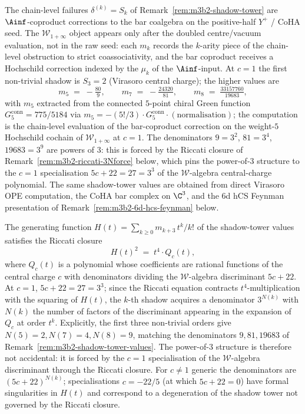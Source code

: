\begin{remark}
\label{rem:m3b2-shadow-tower-values}
The chain-level failures $\delta^{(k)} = S_k$ of
Remark~\ref{rem:m3b2-shadow-tower} are $\Ainf$-coproduct corrections to
the bar coalgebra on the positive-half $Y^+$ / CoHA seed. The
$\mathcal{W}_{1+\infty}$ object appears only after the doubled
centre/vacuum evaluation, not in the raw seed: each
$m_k$ records the $k$-arity piece of the chain-level obstruction to
strict coassociativity, and the bar coproduct receives a Hochschild
correction indexed by the $\mu_k$ of the $\Ainf$-input. At
$c = 1$ the first non-trivial shadow is $S_3 = 2$ (Virasoro central
charge); the higher values are
\[
 m_5 \;=\; -\tfrac{80}{9}, \qquad
 m_7 \;=\; -\tfrac{24320}{81}, \qquad
 m_8 \;=\; \tfrac{33157760}{19683},
\]
with $m_5$ extracted from the connected $5$-point chiral Green function
$G_5^{\mathrm{conn}} = 775/5184$ via $m_5 = -(5!/3) \cdot G_5^{\mathrm{conn}}
\cdot (\text{normalisation})$; the computation is the chain-level evaluation
of the bar-coproduct correction on the weight-$5$ Hochschild
cochain of $\mathcal{W}_{1+\infty}$ at $c = 1$. The denominators
$9 = 3^2$, $81 = 3^4$, $19683 = 3^9$ are powers of $3$: this is
forced by the Riccati closure of Remark~\ref{rem:m3b2-riccati-3Nforce}
below, which pins the power-of-$3$ structure to the $c = 1$ specialisation
$5c + 22 = 27 = 3^3$ of the $\mathcal{W}$-algebra central-charge
polynomial. The same shadow-tower values are obtained from direct
Virasoro OPE computation, the CoHA bar complex on $\C^3$, and the
$6$d hCS Feynman presentation of
Remark~\ref{rem:m3b2-6d-hcs-feynman} below.
\end{remark}

\begin{remark}
\label{rem:m3b2-riccati-3Nforce}
The generating function $H(t) = \sum_{k \geq 0} m_{k+3}\, t^k/k!$ of the
shadow-tower values satisfies the Riccati closure
\[
 H(t)^2 \;=\; t^4 \cdot Q_c(t),
\]
where $Q_c(t)$ is a polynomial whose coefficients are rational functions
of the central charge $c$ with denominators dividing the $\mathcal{W}$-algebra
discriminant $5c + 22$. At $c = 1$, $5c + 22 = 27 = 3^3$; since the
Riccati equation contracts $t^4$-multiplication with the squaring of $H(t)$,
the $k$-th shadow acquires a denominator $3^{N(k)}$ with $N(k)$ the number
of factors of the discriminant appearing in the expansion of $Q_c$ at
order $t^k$. Explicitly, the first three non-trivial orders give
$N(5) = 2, N(7) = 4, N(8) = 9$, matching the denominators
$9, 81, 19683$ of Remark~\ref{rem:m3b2-shadow-tower-values}. The
power-of-$3$ structure is therefore not accidental: it is forced by the
$c = 1$ specialisation of the $\mathcal{W}$-algebra discriminant through
the Riccati closure. For $c \neq 1$ generic the denominators are
$(5c + 22)^{N(k)}$; specialisations $c = -22/5$ (at which $5c + 22 = 0$)
have formal singularities in $H(t)$ and correspond to a degeneration of
the shadow tower not governed by the Riccati closure.
\end{remark}

